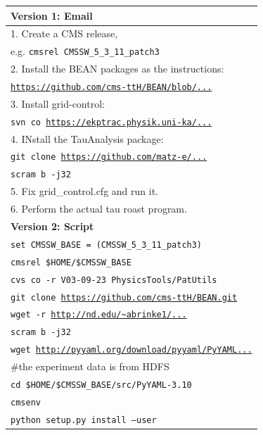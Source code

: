 \documentclass{acm_proc_article-sp}
\begin{document}
\begin{table}
    \centering
    \begin{tabular}{|l|}
        \hline
        {\bf Version 1: Email}\\ \hline
        1. Create a CMS release,\\
            \hspace{9pt} e.g. {\tt cmsrel CMSSW\_5\_3\_11\_patch3} \\
        2. Install the BEAN packages as the instructions: \\
            \hspace{9pt} {\tt \url{https://github.com/cms-ttH/BEAN/blob/...}}\\
        3. Install grid-control: \\ 
            \hspace{9pt} {\tt svn co \url{https://ekptrac.physik.uni-ka/...}} \\
        4. INstall the TauAnalysis package: \\
           \hspace{9pt} {\tt git clone \url{https://github.com/matz-e/...}} \\
           \hspace{9pt} {\tt scram b -j32} \\
        5. Fix grid\_control.cfg and run it. \\
        6. Perform the actual tau roast program. \\ 
        \hline
        {\bf Version 2: Script}\\ \hline
        {\tt set CMSSW\_BASE = (CMSSW\_5\_3\_11\_patch3)} \\
        {\tt cmsrel \$HOME/\$CMSSW\_BASE} \\
        {\tt cvs co -r V03-09-23 PhysicsTools/PatUtils} \\
        {\tt git clone \url{https://github.com/cms-ttH/BEAN.git}} \\
        {\tt wget -r \url{http://nd.edu/~abrinke1/...}} \\
        {\tt scram b -j32} \\
        {\tt wget \url{http://pyyaml.org/download/pyyaml/PyYAML...}}\\
        \#the experiment data is from HDFS \\
        {\tt cd \$HOME/\$CMSSW\_BASE/src/PyYAML-3.10}\\
        {\tt cmsenv}\\
        {\tt python setup.py install --user} \\

\end{tabular}
\end{table}
\end{document}
